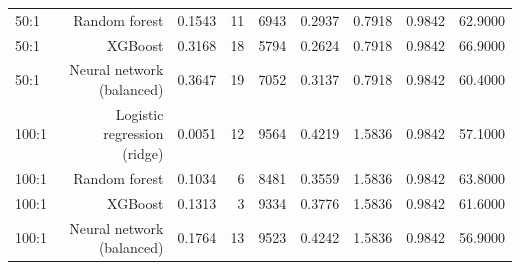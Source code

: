 \begin{table}[htbp]
{\begin{tabular}{lrrrrrrrr}
50:1 & Random forest & 0.1543 & 11 & 6943 & 0.2937 & 0.7918 & 0.9842 & 62.9000 \\
50:1 & XGBoost & 0.3168 & 18 & 5794 & 0.2624 & 0.7918 & 0.9842 & 66.9000 \\
50:1 & Neural network (balanced) & 0.3647 & 19 & 7052 & 0.3137 & 0.7918 & 0.9842 & 60.4000 \\
100:1 & Logistic regression (ridge) & 0.0051 & 12 & 9564 & 0.4219 & 1.5836 & 0.9842 & 57.1000 \\
100:1 & Random forest & 0.1034 & 6 & 8481 & 0.3559 & 1.5836 & 0.9842 & 63.8000 \\
100:1 & XGBoost & 0.1313 & 3 & 9334 & 0.3776 & 1.5836 & 0.9842 & 61.6000 \\
100:1 & Neural network (balanced) & 0.1764 & 13 & 9523 & 0.4242 & 1.5836 & 0.9842 & 56.9000 \\
\bottomrule
\end{tabular}
}
\end{table}
